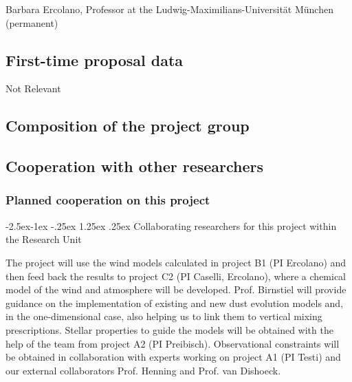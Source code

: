 \documentclass[10pt,fleqn,twoside]{article}
\makeatletter
\newcommand{\Tcol}{\color{blue}}
\renewcommand\paragraph{\@startsection{paragraph}{4}{\z@}%
            {-2.5ex\@plus -1ex \@minus -.25ex}%
            {1.25ex \@plus .25ex}%
            {\normalfont\normalsize\bfseries}}
\makeatother
\begin{document}
Barbara Ercolano, Professor at the Ludwig-Maximilians-Universit\"at
M\"unchen  (permanent)



\subsection{\Tcol First-time proposal data}

Not Relevant

\subsection{\Tcol Composition of the project group}


\subsection{\Tcol Cooperation with other researchers}

\subsubsection{\Tcol Planned cooperation on this project}

\paragraph{\Tcol Collaborating researchers for this project within the
  Research Unit}

The project will use the wind models calculated in project B1 (PI
Ercolano) and then
feed back the results to project C2 (PI Caselli, Ercolano), where a
chemical model of the wind and atmosphere will be developed.
Prof. Birnstiel will provide guidance on the implementation of
existing and new dust evolution models and, in the one-dimensional
case, also helping us to link them to vertical mixing prescriptions. 
Stellar properties to guide the models will be obtained with the help
of the team from project A2 (PI Preibisch). Observational constraints will
be obtained in collaboration with experts working on project A1 (PI
Testi) and our external collaborators Prof. Henning and Prof. van
Dishoeck. 
\end{document}
